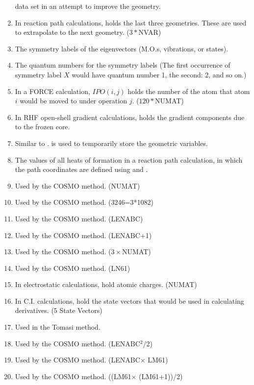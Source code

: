 \begin{enumerate}
data set in an attempt to improve the geometry.
\item {}  In reaction path calculations,  holds the
last three geometries.  These are used to extrapolate to the next geometry. 
($3*$NVAR)
\addtocounter{enumi}{1}
\item {} The symmetry labels of the eigenvectors (M.O.s, 
vibrations, or states). 
\item {} The quantum numbers for the symmetry labels (The first
occurrence of symmetry label $X$ would have quantum number 1, the second: 2,
and so on.)
\item  {} In a FORCE calculation, $IPO(i,j)$  holds the number of the
atom that atom $i$ would be moved to under operation $j$. ($120*$NUMAT)
\item {} In RHF open-shell gradient calculations,  holds
the gradient components due to the frozen core.
\item {} Similar to .   is used to
temporarily store the geometric variables.
\item {} The values of all heats of formation in a reaction
path calculation, in which the path coordinates are defined using
 and .
\item {}  Used by the COSMO method. (NUMAT)
\addtocounter{enumi}{1}
\item {} Used by the COSMO method. (3246=3*1082)
\item {} Used by the COSMO method.  (LENABC)
\item {} Used by the COSMO method.  (LENABC+1)
\item {} Used by the COSMO method. ($3\times $NUMAT)
\item {} Used by the COSMO method. (LN61)
\item {} In electrostatic calculations,  hold atomic
charges. (NUMAT)
\item {} In C.I. calculations,  hold the state
vectors that would be used in calculating derivatives. (5 State Vectors)
\item {} Used in the Tomasi method.
\addtocounter{enumi}{5}
\item {} Used by the COSMO method. (LENABC$^2$/2)
\item {} Used by the COSMO method. (LENABC$\times$ LM61)
\item {} Used by the COSMO method. ((LM61$\times$ (LM61+1))/2)

\end{enumerate}

